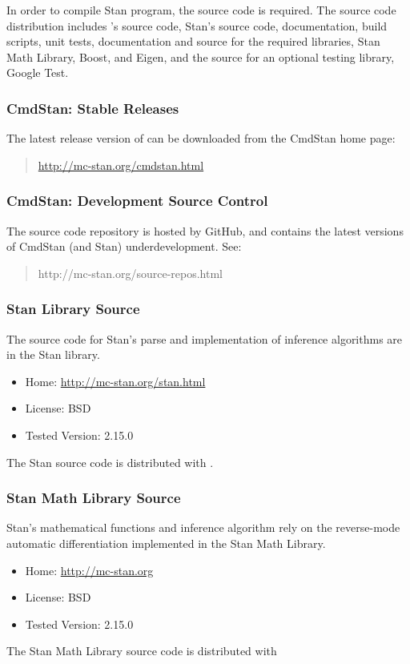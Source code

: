 In order to compile Stan program, the \CmdStan source code is
required.  The \CmdStan source code distribution includes \CmdStan's
source code, Stan's source code, documentation, build scripts, unit
tests, documentation and source for the required libraries, Stan Math
Library, Boost, and Eigen, and the source for an optional testing
library, Google Test.

\subsubsection{CmdStan: Stable Releases}

The latest release version of \CmdStan can be downloaded
from the CmdStan home page:
%
\begin{quote}
\url{http://mc-stan.org/cmdstan.html}
\end{quote}
%

\subsubsection{CmdStan: Development Source Control}

The source code repository is hosted by GitHub, and contains the
latest versions of CmdStan (and Stan) underdevelopment.  See:
%
\begin{quote}
http://mc-stan.org/source-repos.html
\end{quote}

\subsubsection{Stan Library Source}

The source code for Stan's parse and implementation of inference
algorithms are in the Stan library.
%
\begin{itemize}
\item Home: \url{http://mc-stan.org/stan.html}
\item License: BSD
\item Tested Version: 2.15.0
\end{itemize}
%
The Stan source code is distributed with \CmdStan.

\subsubsection{Stan Math Library Source}

Stan's mathematical functions and inference algorithm rely on the
reverse-mode automatic differentiation implemented in the Stan Math
Library.
%
\begin{itemize}
\item Home: \url{http://mc-stan.org}
\item License: BSD
\item Tested Version: 2.15.0
\end{itemize}
%
The Stan Math Library source code is distributed with \CmdStan

